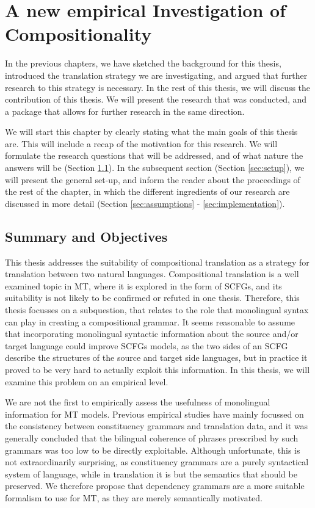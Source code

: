 %
%
%
%

\chapter{A new empirical Investigation of Compositionality}

In the previous chapters, we have sketched the background for this thesis, introduced the translation strategy we are investigating, and argued that further research to this strategy is necessary. In the rest of this thesis, we will discuss the contribution of this thesis. We will present the research that was conducted, and a package that allows for further research in the same direction.

We will start this chapter by clearly stating what the main goals of this thesis are. This will include a recap of the motivation for this research. We will formulate the research questions that will be addressed, and of what nature the answers will be (Section \ref{sec:goals}). In the subsequent section (Section \ref{sec:setup}), we will present the general set-up, and inform the reader about the proceedings of the rest of the chapter, in which the different ingredients of our research are discussed in more detail (Section \ref{sec:assumptions} - \ref{sec:implementation}).


\section{Summary and Objectives}
\label{sec:goals}

This thesis addresses the suitability of compositional translation as a strategy for translation between two natural languages. Compositional translation is a well examined topic in MT, where it is explored in the form of SCFGs, and its suitability is not likely to be confirmed or refuted in one thesis. Therefore, this thesis focusses on a subquestion, that relates to the role that monolingual syntax can play in creating a compositional grammar. It seems reasonable to assume that incorporating monolingual syntactic information about the source and/or target language could improve SCFGs models, as the two sides of an SCFG describe the structures of the source and target side languages, but in practice it proved to be very hard to actually exploit this information. In this thesis, we will examine this problem on an empirical level.

We are not the first to empirically assess the usefulness of monolingual information for MT models. Previous empirical studies have mainly focussed on the consistency between constituency grammars and translation data, and it was generally concluded that the bilingual coherence of phrases prescribed by such grammars was too low to be directly exploitable. Although unfortunate, this is not extraordinarily surprising, as constituency grammars are a purely syntactical system of language, while in translation it is but the semantics that should be preserved. We therefore propose that dependency grammars are a more suitable formalism to use for MT, as they are merely semantically motivated.

